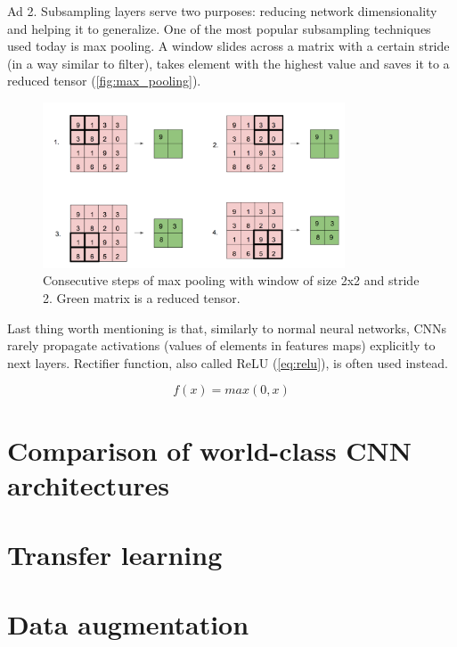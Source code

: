 \documentclass[11pt]{article}
\begin{document}
Ad 2. Subsampling layers serve two purposes: reducing network dimensionality and helping it to generalize. One of the most popular subsampling techniques used today is max pooling. A window slides across a matrix with a certain stride (in a way similar to filter), takes element with the highest value and saves it to a reduced tensor (\autoref{fig:max_pooling}).

\begin{figure}[h]
\includegraphics[width=0.8\textwidth]{max_pooling}
\centering
\caption{Consecutive steps of max pooling with window of size 2x2 and stride 2. Green matrix is a reduced tensor.}
\label{fig:max_pooling}
\end{figure}

Last thing worth mentioning is that, similarly to normal neural networks, CNNs rarely propagate activations (values of elements in features maps) explicitly to next layers. Rectifier function, also called ReLU (\autoref{eq:relu}), is often used instead.

\begin{equation} \label{eq:relu}
f(x) = max(0, x)
\end{equation}
\clearpage

\section{Comparison of world-class CNN architectures} \label{comparison_ccn_archs}
\clearpage

\section{Transfer learning} \label{transfer_learning}
\clearpage

\section{Data augmentation} \label{data_augmentation}
\clearpage
\end{document}
